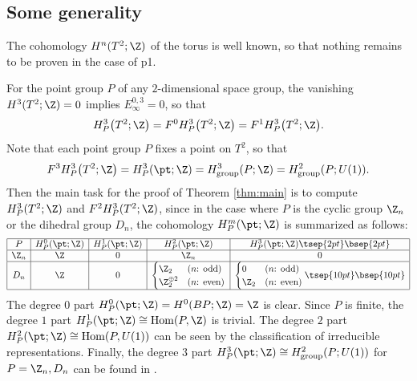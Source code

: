 \subsection{Some generality}\label{subsec:some_generality}

The cohomology $H^n(T^2; \Z)$ of the torus is well known, so that nothing remains to be proven in the case of \textsf{p1}.

For the point group $P$ of any $2$-dimensional space group, the vanishing $H^3(T^2; \Z) = 0$ implies $E^{0, 3}_\infty = 0$, so that
\begin{gather*}
H^3_P\big(T^2; \Z\big) = F^0H^3_P\big(T^2; \Z\big) = F^1H^3_P\big(T^2; \Z\big).
\end{gather*}
Note that each point group $P$ f\/ixes a point on $T^2$, so that
\begin{gather*}
F^3H^3_P\big(T^2; \Z\big) = H^3_P(\pt; \Z)= H^3_{\mathrm{group}}(P; \Z)= H^2_{\mathrm{group}}(P; U(1)).
\end{gather*}
Then the main task for the proof of Theorem \ref{thm:main} is to compute $H^3_P(T^2; \Z)$ and $F^2H^3_P(T^2; \Z)$, since in the case where $P$ is the cyclic group $\Z_n$ or the dihedral group $D_n$, the cohomology $H^m_P(\pt; \Z)$ is summarized as follows:
$$
\begin{array}{|c|c|c|c|c|}
\hline
P & H^0_P(\pt; \Z) & H^1_P(\pt; \Z) & H^2_P(\pt; \Z) & H^3_P(\pt; \Z) \tsep{2pt}\bsep{2pt}\\
\hline
\Z_n & \Z & 0 & \Z_n & 0 \\
\hline
D_n & \Z & 0 &
\begin{cases}
\Z_2 & (\mbox{$n$: odd}) \\
\Z_2^{\oplus 2} & (\mbox{$n$: even})
\end{cases} &
\begin{cases}
0 & (\mbox{$n$: odd}) \\
\Z_2 & (\mbox{$n$: even})
\end{cases}\tsep{10pt}\bsep{10pt}\\
\hline
\end{array}
$$
The degree $0$ part $H^0_P(\pt; \Z) = H^0(BP; \Z) = \Z$ is clear. Since $P$ is f\/inite, the degree $1$ part $H^1_P(\pt; \Z) \cong \operatorname{Hom}(P, \Z)$ is trivial. The degree $2$ part $H^2_P(\pt; \Z) \cong \operatorname{Hom}(P, U(1))$ can be seen by the classif\/ication of irreducible representations. Finally, the degree $3$ part $H^3_P(\pt; \Z) \cong H^2_{\mathrm{group}}(P; U(1))$ for $P = \Z_n, D_n$ can be found in \cite{Ka}.

